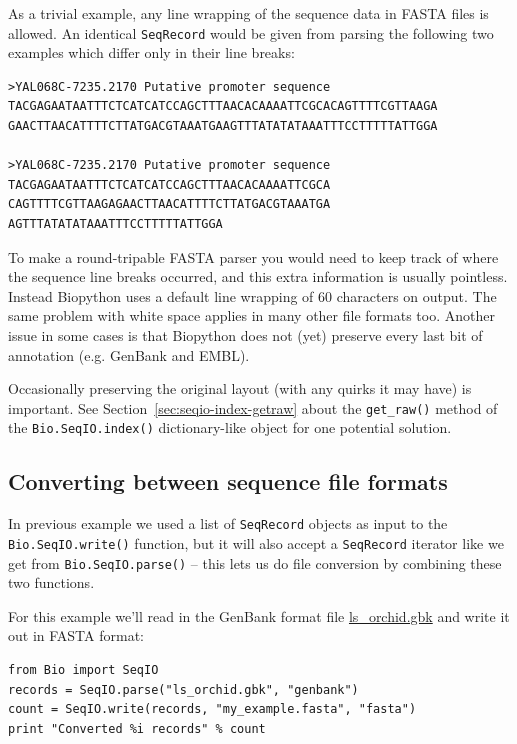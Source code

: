 \documentclass{report}
\begin{document}
As a trivial example, any line wrapping of the sequence data in FASTA files is
allowed. An identical \verb|SeqRecord| would be given from parsing the following
two examples which differ only in their line breaks:

\begin{verbatim}
>YAL068C-7235.2170 Putative promoter sequence
TACGAGAATAATTTCTCATCATCCAGCTTTAACACAAAATTCGCACAGTTTTCGTTAAGA
GAACTTAACATTTTCTTATGACGTAAATGAAGTTTATATATAAATTTCCTTTTTATTGGA

>YAL068C-7235.2170 Putative promoter sequence
TACGAGAATAATTTCTCATCATCCAGCTTTAACACAAAATTCGCA
CAGTTTTCGTTAAGAGAACTTAACATTTTCTTATGACGTAAATGA
AGTTTATATATAAATTTCCTTTTTATTGGA
\end{verbatim}

To make a round-tripable FASTA parser you would need to keep track of where the
sequence line breaks occurred, and this extra information is usually pointless.
Instead Biopython uses a default line wrapping of $60$ characters on output.
The same problem with white space applies in many other file formats too.
Another issue in some cases is that Biopython does not (yet) preserve every
last bit of annotation (e.g. GenBank and EMBL).

Occasionally preserving the original layout (with any quirks it may have) is
important. See Section~\ref{sec:seqio-index-getraw} about the \verb|get_raw()|
method of the \verb|Bio.SeqIO.index()| dictionary-like object for one potential
solution.

\subsection{Converting between sequence file formats}
\label{sec:SeqIO-conversion}

In previous example we used a list of \verb|SeqRecord| objects as input to the \verb|Bio.SeqIO.write()| function, but it will also accept a \verb|SeqRecord| iterator like we get from \verb|Bio.SeqIO.parse()| -- this lets us do file conversion by combining these two functions.

For this example we'll read in the GenBank format file \href{http://biopython.org/DIST/docs/tutorial/examples/ls_orchid.gbk}{ls\_orchid.gbk} and write it out in FASTA format:

\begin{verbatim}
from Bio import SeqIO
records = SeqIO.parse("ls_orchid.gbk", "genbank")
count = SeqIO.write(records, "my_example.fasta", "fasta")
print "Converted %i records" % count
\end{verbatim}
\end{document}
